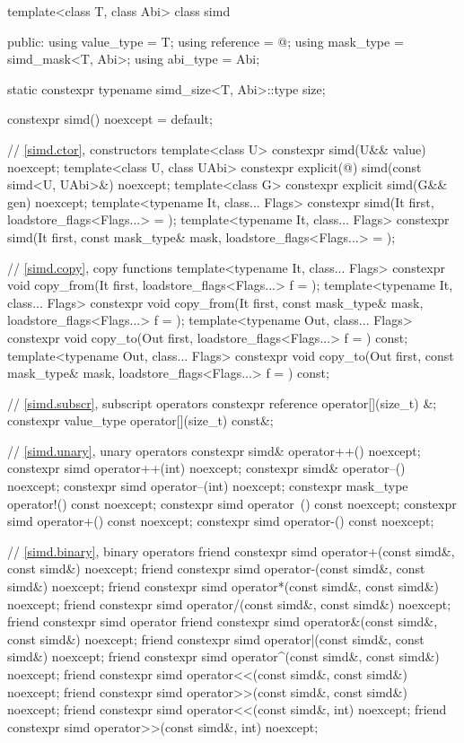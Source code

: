 \begin{codeblock}
template<class T, class Abi> class simd {
public:
  using value_type = T;
  using reference = @\seebelow@;
  using mask_type = simd_mask<T, Abi>;
  using abi_type = Abi;

  static constexpr typename simd_size<T, Abi>::type size;

  constexpr simd() noexcept = default;

  // \ref{simd.ctor},  constructors
  template<class U> constexpr simd(U&& value) noexcept;
  template<class U, class UAbi>
    constexpr explicit(@\seebelow@) simd(const simd<U, UAbi>&) noexcept;
  template<class G> constexpr explicit simd(G&& gen) noexcept;
  template<typename It, class... Flags>
    constexpr simd(It first, loadstore_flags<Flags...> = {});
  template<typename It, class... Flags>
    constexpr simd(It first, const mask_type& mask, loadstore_flags<Flags...> = {});

  // \ref{simd.copy},  copy functions
  template<typename It, class... Flags>
    constexpr void copy_from(It first, loadstore_flags<Flags...> f = {});
  template<typename It, class... Flags>
    constexpr void copy_from(It first, const mask_type& mask, loadstore_flags<Flags...> f = {});
  template<typename Out, class... Flags>
    constexpr void copy_to(Out first, loadstore_flags<Flags...> f = {}) const;
  template<typename Out, class... Flags>
    constexpr void copy_to(Out first, const mask_type& mask, loadstore_flags<Flags...> f = {}) const;

  // \ref{simd.subscr},  subscript operators
  constexpr reference operator[](size_t) &;
  constexpr value_type operator[](size_t) const&;

  // \ref{simd.unary},  unary operators
  constexpr simd& operator++() noexcept;
  constexpr simd operator++(int) noexcept;
  constexpr simd& operator--() noexcept;
  constexpr simd operator--(int) noexcept;
  constexpr mask_type operator!() const noexcept;
  constexpr simd operator~() const noexcept;
  constexpr simd operator+() const noexcept;
  constexpr simd operator-() const noexcept;

  // \ref{simd.binary},  binary operators
  friend constexpr simd operator+(const simd&, const simd&) noexcept;
  friend constexpr simd operator-(const simd&, const simd&) noexcept;
  friend constexpr simd operator*(const simd&, const simd&) noexcept;
  friend constexpr simd operator/(const simd&, const simd&) noexcept;
  friend constexpr simd operator%
  friend constexpr simd operator&(const simd&, const simd&) noexcept;
  friend constexpr simd operator|(const simd&, const simd&) noexcept;
  friend constexpr simd operator^(const simd&, const simd&) noexcept;
  friend constexpr simd operator<<(const simd&, const simd&) noexcept;
  friend constexpr simd operator>>(const simd&, const simd&) noexcept;
  friend constexpr simd operator<<(const simd&, int) noexcept;
  friend constexpr simd operator>>(const simd&, int) noexcept;

}
\end{codeblock}
